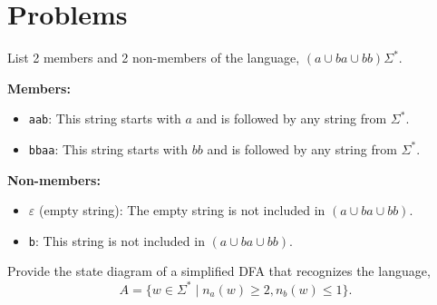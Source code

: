 \documentclass[addpoints]{exam}
\theoremstyle{claim}
\begin{document}
\section*{Problems}
\begin{questions}

\question[15] List 2 members and 2 non-members of the language, $(a \cup ba \cup bb)\Sigma^*$.
  \begin{solution}
            \textbf{Members:}
        \begin{itemize}
            \item \texttt{aab}: This string starts with \(a\) and is followed by any string from \(\Sigma^*\).
            \item \texttt{bbaa}: This string starts with \(bb\) and is followed by any string from \(\Sigma^*\).
        \end{itemize}

        \textbf{Non-members:}
        \begin{itemize}
            \item \(\varepsilon\) (empty string): The empty string is not included in \((a \cup ba \cup bb)\).
            \item \texttt{b}: This string is not included in \((a \cup ba \cup bb)\).
        \end{itemize}

  \end{solution}
\question[20] Provide the state diagram of a simplified DFA that recognizes the language, 
  \[
    A=\{w\in\Sigma^* \mid n_a(w) \ge 2, n_b(w) \le 1\}.
  \]
  \begin{solution} 
\end{solution}
\end{questions}
\end{document}
